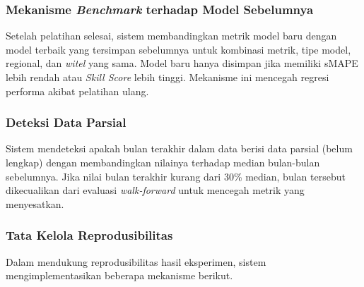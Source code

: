 \subsubsection{Mekanisme \textit{Benchmark} terhadap Model Sebelumnya}

Setelah pelatihan selesai, sistem membandingkan metrik model baru dengan model terbaik yang tersimpan sebelumnya untuk kombinasi metrik, tipe model, regional, dan \textit{witel} yang sama. Model baru hanya disimpan jika memiliki sMAPE lebih rendah atau \textit{Skill Score} lebih tinggi. Mekanisme ini mencegah regresi performa akibat pelatihan ulang.

\subsubsection{Deteksi Data Parsial}

Sistem mendeteksi apakah bulan terakhir dalam data berisi data parsial (belum lengkap) dengan membandingkan nilainya terhadap median bulan-bulan sebelumnya. Jika nilai bulan terakhir kurang dari 30\% median, bulan tersebut dikecualikan dari evaluasi \textit{walk-forward} untuk mencegah metrik yang menyesatkan.

\subsubsection{Tata Kelola Reprodusibilitas}
\label{subsubsec:reprodusibilitas}

Dalam mendukung reprodusibilitas hasil eksperimen, sistem mengimplementasikan beberapa mekanisme berikut.


